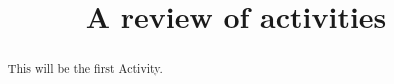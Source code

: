 \documentclass{ximera}
\title[Dig-In:]{A review of activities}
\begin{document}
\begin{abstract}
    This will be the first Activity.
\end{abstract}
\maketitle
\end{document}
